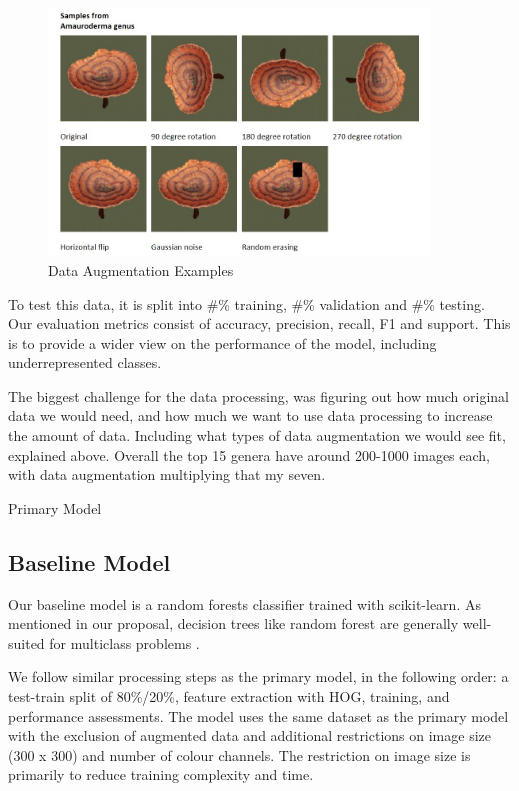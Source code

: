 \documentclass{article} %
\begin{document}
\begin{figure}[h]
    \begin{center}
    \includegraphics[width=0.9\textwidth]{figures/data_aug.jpg}
    \end{center}
    \caption{Data Augmentation Examples}
\end{figure}

\FloatBarrier

To test this data, it is split into #\% training, #\% validation and #\% testing. Our evaluation metrics consist of accuracy, precision, recall, F1 and support. This is to provide a wider view on the performance of the model, including underrepresented classes.

The biggest challenge for the data processing, was figuring out how much original data we would need, and how much we want to use data processing to increase the amount of data. Including what types of data augmentation we would see fit, explained above. Overall the top 15 genera have around 200-1000 images each, with data augmentation multiplying that my seven.




Primary Model


\subsection{Baseline Model}
Our baseline model is a random forests classifier trained with scikit-learn. As mentioned in our proposal, decision trees like random forest are generally well-suited for multiclass problems \citep{GallRazaviEtAl.IntroductionRandomForests.2012}.

We follow similar processing steps as the primary model, in the following order: a test-train split of 80\%/20\%, feature extraction with HOG, training, and performance assessments. The model uses the same dataset as the primary model with the exclusion of augmented data and additional restrictions on image size (300 x 300) and number of colour channels. The restriction on image size is primarily to reduce training complexity and time.
\end{document}
